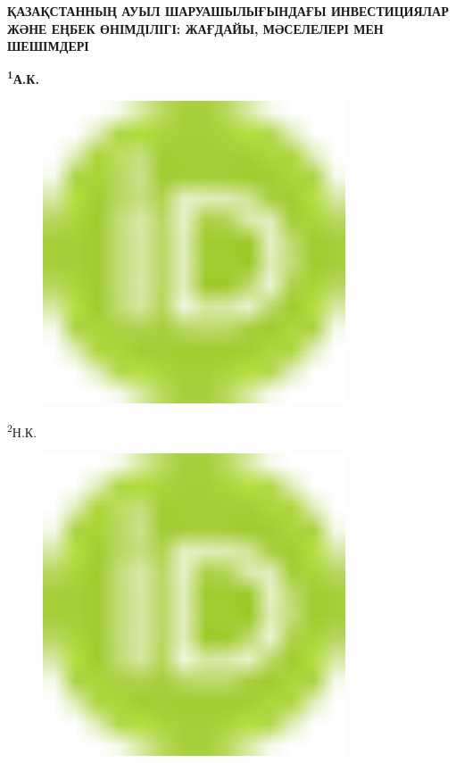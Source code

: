
{\bfseries ҚАЗАҚСТАННЫҢ АУЫЛ ШАРУАШЫЛЫҒЫНДАҒЫ ИНВЕСТИЦИЯЛАР ЖӘНЕ ЕҢБЕК
ӨНІМДІЛІГІ: ЖАҒДАЙЫ, МӘСЕЛЕЛЕРІ МЕН ШЕШІМДЕРІ}

{\bfseries \textsuperscript{1}А.К.
\begin{figure}[H]
	\centering
	\includegraphics[width=0.8\textwidth]{media/ekon/image1}
	\caption*{}
\end{figure}

\textsuperscript{2}Н.К.
\begin{figure}[H]
	\centering
	\includegraphics[width=0.8\textwidth]{media/ekon/image1}
	\caption*{}
\end{figure}

}
